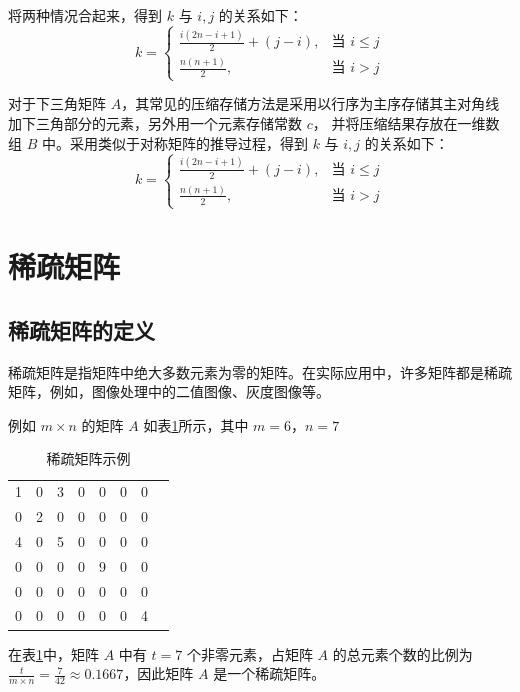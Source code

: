 \documentclass[lang=cn,newtx,10pt,scheme=chinese]{../elegantbook}
\begin{document}
将两种情况合起来，得到 $k$ 与 $i,j$ 的关系如下：
\[
k =
\begin{cases} 
\frac{i(2n-i+1)}{2} + (j-i), & \text{当 } i \leq j \\ 
\frac{n(n+1)}{2}, & \text{当 } i > j
\end{cases}
\]

对于下三角矩阵 $A$，其常见的压缩存储方法是采用以行序为主序存储其主对角线加下三角部分的元素，另外用一个元素存储常数 $c$，
并将压缩结果存放在一维数组 $B$ 中。采用类似于对称矩阵的推导过程，得到 $k$ 与 $i,j$ 的关系如下：
\[
k =
\begin{cases} 
\frac{i(2n-i+1)}{2} + (j-i), & \text{当 } i \leq j \\ 
\frac{n(n+1)}{2}, & \text{当 } i > j
\end{cases}
\]
\section{稀疏矩阵}



\subsection{稀疏矩阵的定义}

稀疏矩阵是指矩阵中绝大多数元素为零的矩阵。在实际应用中，许多矩阵都是稀疏矩阵，例如，图像处理中的二值图像、灰度图像等。

例如 $m \times n$ 的矩阵 $A$ 如表\ref{table:sparse_matrix}所示，其中 $m = 6$，$n = 7$

\begin{table}[htbp]
  \centering
  \caption{稀疏矩阵示例}
  \begin{tabular}{||ccccccc||c}
    
    1 & 0 & 3 & 0 & 0 & 0 & 0 \\
    0 & 2 & 0 & 0 & 0 & 0 & 0 \\
    4 & 0 & 5 & 0 & 0 & 0 & 0 \\
    0 & 0 & 0 & 0 & 9 & 0 & 0 \\
    0 & 0 & 0 & 0 & 0 & 0 & 0 \\
    0 & 0 & 0 & 0 & 0 & 0 & 4 \\
    
  \end{tabular}
  \label{table:sparse_matrix}
\end{table}

在表\ref{table:sparse_matrix}中，矩阵 $A$ 中有 $t = 7$ 个非零元素，占矩阵 $A$ 的总元素个数的比例为 $\frac{t}{m \times n} = \frac{7}{42} \approx 0.1667$，因此矩阵 $A$ 是一个稀疏矩阵。
\end{document}
